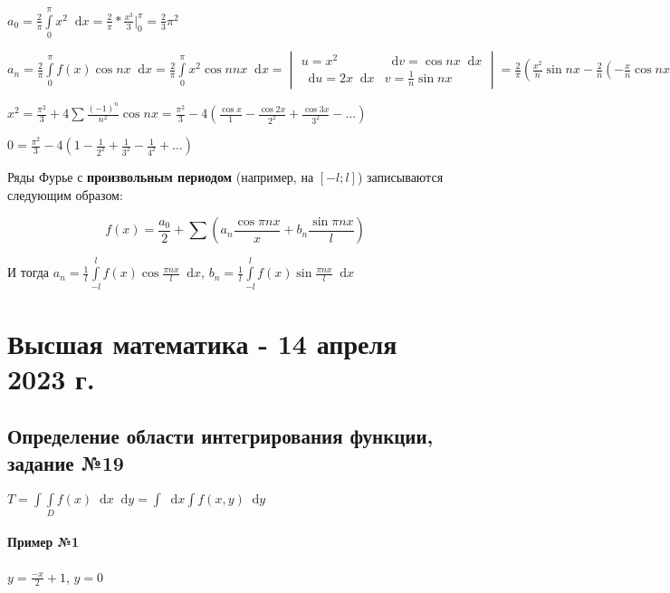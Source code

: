 \documentclass{article}
\newcommand*\diff{\mathop{}\!\mathrm{d}}
\begin{document}
$a_0 = \frac{2}{\pi} \int\limits_{0}^{\pi} x^2 \diff x = \frac{2}{\pi} * \frac{x^3}{3} \bigg|_{0}^{\pi} = \frac{2}{3} \pi^2$

$a_{n} = \frac{2}{\pi} \int\limits_{0}^{\pi} f(x) \cos n x \diff x = \frac{2}{\pi} \int\limits_{0}^{\pi} x^2 \cos n n x \diff x = \begin{vmatrix}
    u = x^2 & \diff v = \cos n x \diff x \\
    \diff u = 2x \diff x & v = \frac{1}{n} \sin n x
\end{vmatrix} = \frac{2}{\pi} (\frac{x^2}{n} \sin n x - \frac{2}{n} (-\frac{x}{n} \cos n x + \frac{1}{n^2} \sin n x)) \bigg|_{0}^{\pi} = \frac{4}{\pi n^2} (\pi \cos \pi n - 0) = \frac{4 \cos \pi n}{n^2} = \frac{4}{n^2} (-1)^{n}$

\hfill

$x^2 = \frac{\pi^2}{3} + 4 \sum \frac{(-1)^{n}}{n^2} \cos n x = \frac{\pi^2}{3} - 4 (\frac{\cos x}{1} - \frac{\cos 2 x}{2^2} + \frac{\cos 3 x}{3^2} - \dots)$

$0 = \frac{\pi^2}{3} - 4 (1 - \frac{1}{2^2} + \frac{1}{3^2} - \frac{1}{4^2} + \dots)$

\hfill

Ряды Фурье с \textbf{произвольным периодом} (например, на $[-l; l]$) записываются следующим образом:

$$f(x) = \frac{a_0}{2} + \sum (a_{n} \frac{\cos \pi n x}{x} + b_{n} \frac{\sin \pi n x}{l})$$

И тогда $a_{n} = \frac{1}{l} \int\limits_{- l}^{l} f(x) \cos \frac{\pi n x}{l} \diff x$, $b_{n} = \frac{1}{l} \int\limits_{- l}^{l} f(x) \sin \frac{\pi n x}{l} \diff x$

\pagebreak
\section{Высшая математика - 14 апреля 2023 г.}

\subsection{Определение области интегрирования функции, задание №19}

$T = \int \int\limits_{D} f(x) \diff x \diff y = \int \diff x \int f(x, y) \diff y$

\paragraph{Пример №1}

$y = \frac{-x}{2} + 1$, $y = 0$
\end{document}
